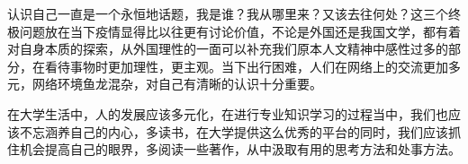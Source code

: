 \documentclass[AutoFakeBold]{LZUThesis}
\begin{document}
认识自己一直是一个永恒地话题，我是谁？我从哪里来？又该去往何处？这三个终极问题放在当下疫情显得比以往更有讨论价值，不论是外国还是我国文学，都有着对自身本质的探索，从外国理性的一面可以补充我们原本人文精神中感性过多的部分，在看待事物时更加理性，更主观。当下出行困难，人们在网络上的交流更加多元，网络环境鱼龙混杂，对自己有清晰的认识十分重要。

在大学生活中，人的发展应该多元化，在进行专业知识学习的过程当中，我们也应该不忘涵养自己的内心，多读书，在大学提供这么优秀的平台的同时，我们应该抓住机会提高自己的眼界，多阅读一些著作，从中汲取有用的思考方法和处事方法。

\backmatter


\printbib
\nocite{*} %




\end{document}

